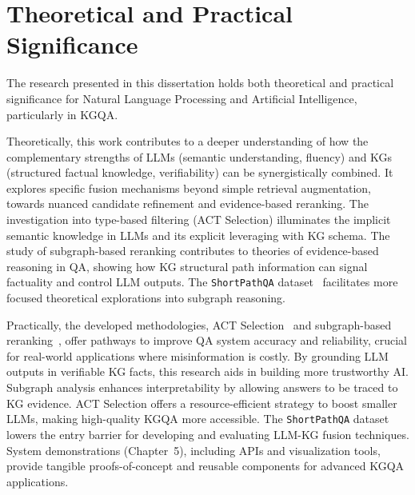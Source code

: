 \section*{Theoretical and Practical Significance}
\label{sec:synopsis:significance}
The research presented in this dissertation holds both theoretical and practical significance for Natural Language Processing and Artificial Intelligence, particularly in KGQA.

Theoretically, this work contributes to a deeper understanding of how the complementary strengths of LLMs (semantic understanding, fluency) and KGs (structured factual knowledge, verifiability) can be synergistically combined. It explores specific fusion mechanisms beyond simple retrieval augmentation, towards nuanced candidate refinement and evidence-based reranking. The investigation into type-based filtering (ACT Selection) illuminates the implicit semantic knowledge in LLMs and its explicit leveraging with KG schema. The study of subgraph-based reranking contributes to theories of evidence-based reasoning in QA, showing how KG structural path information can signal factuality and control LLM outputs. The \texttt{ShortPathQA} dataset~\cite{DBLP:conf/nldb/SalnikovSPQA25} facilitates more focused theoretical explorations into subgraph reasoning.

Practically, the developed methodologies, ACT Selection~\cite{DBLP:journals/corr/abs-2310-07008} and subgraph-based reranking~\cite{DBLP:journals/corr/abs-2310-02166}, offer pathways to improve QA system accuracy and reliability, crucial for real-world applications where misinformation is costly. By grounding LLM outputs in verifiable KG facts, this research aids in building more trustworthy AI. Subgraph analysis enhances interpretability by allowing answers to be traced to KG evidence. ACT Selection offers a resource-efficient strategy to boost smaller LLMs, making high-quality KGQA more accessible. The \texttt{ShortPathQA} dataset~\cite{DBLP:conf/nldb/SalnikovSPQA25} lowers the entry barrier for developing and evaluating LLM-KG fusion techniques. System demonstrations (Chapter~5), including APIs and visualization tools, provide tangible proofs-of-concept and reusable components for advanced KGQA applications.

